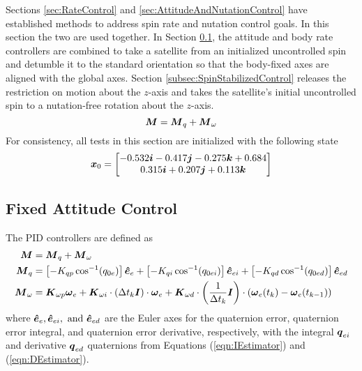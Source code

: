 Sections \ref{sec:RateControl} and \ref{sec:AttitudeAndNutationControl} have established methods to address spin rate and nutation control goals.  In this section the two are used together.  In Section \ref{subsec:FixedAttitudeControl}, the attitude and body rate controllers are combined to take a satellite from an initialized uncontrolled spin and detumble it to the standard orientation so that the body-fixed axes are aligned with the global axes.  Section \ref{subsec:SpinStabilizedControl} releases the restriction on motion about the $z$-axis and takes the satellite's initial uncontrolled spin to a nutation-free rotation about the $z$-axis.
\begin{equation}
    \boldsymbol{M} = \boldsymbol{M}_{q} + \boldsymbol{M}_{\omega}
\end{equation}
For consistency, all tests in this section are initialized with the following state
\begin{equation}
  \boldsymbol{x}_0 = \begin{bmatrix} -0.532 \boldsymbol{i} -0.417 \boldsymbol{j} -0.275 \boldsymbol{k} +0.684 \\ 0.315 \boldsymbol{i} +0.207 \boldsymbol{j} +0.113 \boldsymbol{k} \end{bmatrix}
  \label{eqn:attitude_and_body_rate_control_ic}
\end{equation}

\subsection{Fixed Attitude Control}
\label{subsec:FixedAttitudeControl}
The PID controllers are defined as
\begin{equation}
  \begin{aligned}
    \boldsymbol{M} &= \boldsymbol{M}_{q} + \boldsymbol{M}_{\omega} \\
    \boldsymbol{M}_{q} &= \left[- K_{qp} \cos^{-1} (q_{0e}) \right] \boldsymbol{\hat{e}}_e + \left[- K_{qi} \cos^{-1} (q_{0ei}) \right] \boldsymbol{\hat{e}}_{ei} + \left[- K_{qd} \cos^{-1} (q_{0ed}) \right] \boldsymbol{\hat{e}}_{ed} \\
    \boldsymbol{M}_{\omega} &= \boldsymbol{K}_{\omega p} \boldsymbol{\omega}_e + \boldsymbol{K}_{\omega i} \cdot (\Delta t_k \boldsymbol{I})\cdot \boldsymbol{\omega}_e + \boldsymbol{K}_{\omega d} \cdot \left(\frac{1}{\Delta t_k} \boldsymbol{I}\right) \cdot (\boldsymbol{\omega}_e(t_k) - \boldsymbol{\omega}_e(t_{k-1}))
  \end{aligned}
\end{equation}
where $\boldsymbol{\hat{e}}_e, \boldsymbol{\hat{e}}_{ei}, \text{ and } \boldsymbol{\hat{e}}_{ed}$ are the Euler axes for the quaternion error, quaternion error integral, and quaternion error derivative, respectively, with the integral $\boldsymbol{q}_{ei}$ and derivative $\boldsymbol{q}_{ed}$ quaternions from Equations (\ref{eqn:IEstimator}) and (\ref{eqn:DEstimator}).

